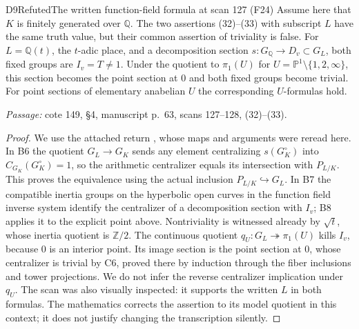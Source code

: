 \begin{result}{D9}{Refuted}{The written function-field formula at scan 127 (F24)}
Assume here that $K$ is finitely generated over $\mathbb Q$. The two assertions (32)--(33) with subscript $L$ have the same truth value, but their common assertion of triviality is false. For $L=\mathbb Q(t)$, the $t$-adic place, and a decomposition section $s:G_{\mathbb Q}\to D_v\subset G_L$, both fixed groups are $I_v=T\ne1$. Under the quotient to $\pi_1(U)$ for $U=\mathbb P^1\setminus\{1,2,\infty\}$, this section becomes the point section at $0$ and both fixed groups become trivial. For point sections of elementary anabelian $U$ the corresponding $U$-formulas hold.
\par\emph{Passage:} cote 149, \S4, manuscript p.~63, scans 127--128, (32)--(33).
\end{result}
\begin{proof}
We use the attached return \cite[Statements B6--B8 and C6]{DE_CyclotomicReturn}, whose maps and arguments were reread here. In B6 the quotient $G_L\to G_K$ sends any element centralizing $s(G_K^\circ)$ into $C_{G_K}(G_K^\circ)=1$, so the arithmetic centralizer equals its intersection with $P_{L/K}$. This proves the equivalence using the actual inclusion $P_{L/K}\hookrightarrow G_L$. In B7 the compatible inertia groups on the hyperbolic open curves in the function field inverse system identify the centralizer of a decomposition section with $I_v$; B8 applies it to the explicit point above. Nontriviality is witnessed already by $\sqrt t$, whose inertia quotient is $\mathbb Z/2$. The continuous quotient $q_U:G_L\twoheadrightarrow\pi_1(U)$ kills $I_v$, because $0$ is an interior point. Its image section is the point section at $0$, whose centralizer is trivial by C6, proved there by induction through the fiber inclusions and tower projections. We do not infer the reverse centralizer implication under $q_U$.
The scan was also visually inspected: it supports the written $L$ in both formulas. The mathematics corrects the assertion to its model quotient in this context; it does not justify changing the transcription silently.
\end{proof}

